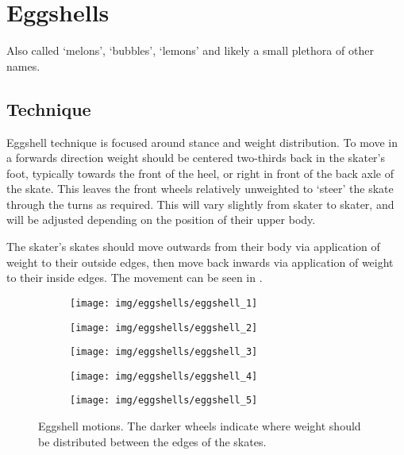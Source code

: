 \section{Eggshells}
\label{sec:sticky/eggshells}

Also called `melons', `bubbles', `lemons' and likely a small plethora of other names. 


\subsection*{Technique}

Eggshell technique is focused around stance and weight distribution.
To move in a forwards direction weight should be centered two-thirds back in the skater's foot, typically towards the front of the heel, or right in front of the back axle of the skate.  
This leaves the front wheels relatively unweighted to `steer' the skate through the turns as required. 
This will vary slightly from skater to skater, and will be adjusted depending on the position of their upper body. 

The skater's skates should move outwards from their body via application of weight to their outside edges, then move back inwards via application of weight to their inside edges.
The movement can be seen in .

\begin{figure}
\begin{center}
\begin{subfigure}{0.19\linewidth}
\texttt{[image: img/eggshells/eggshell\_1]}
\end{subfigure}
\begin{subfigure}{0.19\linewidth}
\texttt{[image: img/eggshells/eggshell\_2]}
\end{subfigure}
\begin{subfigure}{0.19\linewidth}
\texttt{[image: img/eggshells/eggshell\_3]}
\end{subfigure}
\begin{subfigure}{0.19\linewidth}
\texttt{[image: img/eggshells/eggshell\_4]}
\end{subfigure}
\begin{subfigure}{0.19\linewidth}
\texttt{[image: img/eggshells/eggshell\_5]}
\end{subfigure}
\caption{Eggshell motions. The darker wheels indicate where weight should be distributed between the edges of the skates. 
\label{fig:sticky/eggshells}
}
\end{center}
\end{figure}



